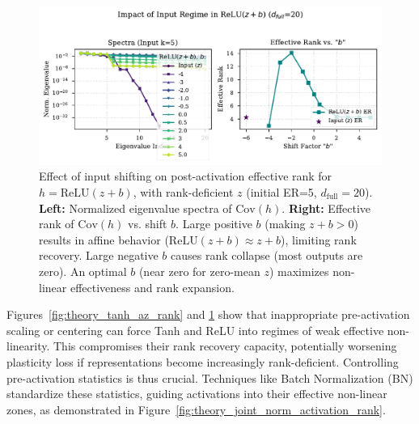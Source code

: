 \documentclass{article}
\begin{document}
\begin{figure}[ht!]
    \centering
    \includegraphics[width=0.7\linewidth]{figures/theory_relu_zb_rank.pdf} %
    \caption{Effect of input shifting on post-activation effective rank for $h = \mathrm{ReLU}(z+b)$, with rank-deficient $z$ (initial ER=5, $d_{\text{full}}=20$). \textbf{Left:} Normalized eigenvalue spectra of $\mathrm{Cov}(h)$. \textbf{Right:} Effective rank of $\mathrm{Cov}(h)$ vs. shift $b$. Large positive $b$ (making $z+b > 0$) results in affine behavior ($\mathrm{ReLU}(z+b) \approx z+b$), limiting rank recovery. Large negative $b$ causes rank collapse (most outputs are zero). An optimal $b$ (near zero for zero-mean $z$) maximizes non-linear effectiveness and rank expansion.}
    \label{fig:theory_relu_zb_rank}
\end{figure}

Figures~\ref{fig:theory_tanh_az_rank} and \ref{fig:theory_relu_zb_rank} show that inappropriate pre-activation scaling or centering can force Tanh and ReLU into regimes of weak effective non-linearity. This compromises their rank recovery capacity, potentially worsening plasticity loss if representations become increasingly rank-deficient. Controlling pre-activation statistics is thus crucial. Techniques like Batch Normalization (BN) standardize these statistics, guiding activations into their effective non-linear zones, as demonstrated in Figure~\ref{fig:theory_joint_norm_activation_rank}.
\end{document}

